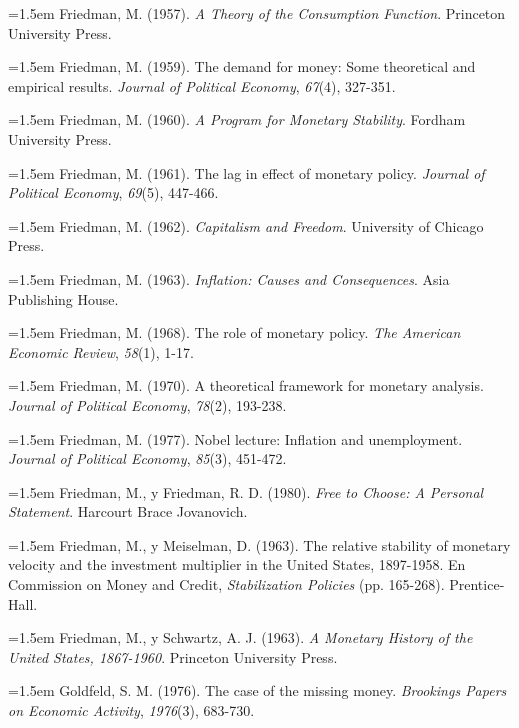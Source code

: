 \documentclass[10pt,a4paper]{article}
\begin{document}
\noindent\hangindent=1.5em Friedman, M. (1957). \textit{A Theory of the Consumption Function}. Princeton University Press.

\noindent\hangindent=1.5em Friedman, M. (1959). The demand for money: Some theoretical and empirical results. \textit{Journal of Political Economy}, \textit{67}(4), 327-351.

\noindent\hangindent=1.5em Friedman, M. (1960). \textit{A Program for Monetary Stability}. Fordham University Press.

\noindent\hangindent=1.5em Friedman, M. (1961). The lag in effect of monetary policy. \textit{Journal of Political Economy}, \textit{69}(5), 447-466.

\noindent\hangindent=1.5em Friedman, M. (1962). \textit{Capitalism and Freedom}. University of Chicago Press.

\noindent\hangindent=1.5em Friedman, M. (1963). \textit{Inflation: Causes and Consequences}. Asia Publishing House.

\noindent\hangindent=1.5em Friedman, M. (1968). The role of monetary policy. \textit{The American Economic Review}, \textit{58}(1), 1-17.

\noindent\hangindent=1.5em Friedman, M. (1970). A theoretical framework for monetary analysis. \textit{Journal of Political Economy}, \textit{78}(2), 193-238.

\noindent\hangindent=1.5em Friedman, M. (1977). Nobel lecture: Inflation and unemployment. \textit{Journal of Political Economy}, \textit{85}(3), 451-472.

\noindent\hangindent=1.5em Friedman, M., y Friedman, R. D. (1980). \textit{Free to Choose: A Personal Statement}. Harcourt Brace Jovanovich.

\noindent\hangindent=1.5em Friedman, M., y Meiselman, D. (1963). The relative stability of monetary velocity and the investment multiplier in the United States, 1897-1958. En Commission on Money and Credit, \textit{Stabilization Policies} (pp. 165-268). Prentice-Hall.

\noindent\hangindent=1.5em Friedman, M., y Schwartz, A. J. (1963). \textit{A Monetary History of the United States, 1867-1960}. Princeton University Press.

\noindent\hangindent=1.5em Goldfeld, S. M. (1976). The case of the missing money. \textit{Brookings Papers on Economic Activity}, \textit{1976}(3), 683-730.
\end{document}
